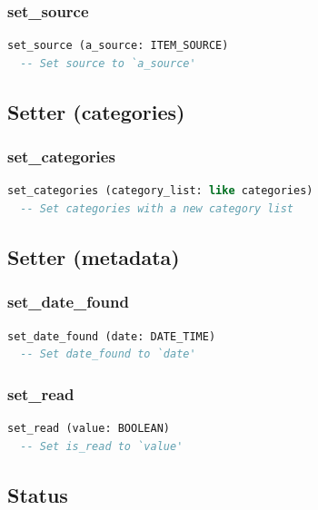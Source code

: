 \subsubsection{set\_source}

\begin{lstlisting}[language=Eiffel]
set_source (a_source: ITEM_SOURCE)
  -- Set source to `a_source'
\end{lstlisting}

\subsection{Setter (categories)}
\label{sec:item-setter-categories}

\subsubsection{set\_categories}

\begin{lstlisting}[language=Eiffel]
set_categories (category_list: like categories)
  -- Set categories with a new category list
\end{lstlisting}

\subsection{Setter (metadata)}
\label{sec:item-setter-metadata}

\subsubsection{set\_date\_found}

\begin{lstlisting}[language=Eiffel]
set_date_found (date: DATE_TIME)
  -- Set date_found to `date'
\end{lstlisting}

\subsubsection{set\_read}

\begin{lstlisting}[language=Eiffel]
set_read (value: BOOLEAN)
  -- Set is_read to `value'
\end{lstlisting}

\subsection{Status}
\label{sec:item-status}

